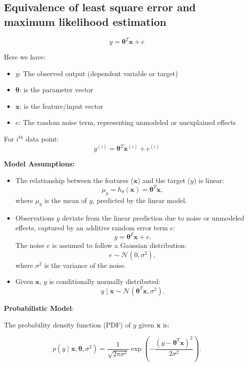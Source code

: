\subsection{Equivalence of least square error and maximum likelihood estimation}
\[
    y = \boldsymbol{\theta}^T \mathbf{x} + e
\]

Here we have:
\begin{itemize}
    \item \( y \): The observed output (dependent variable or target)
    \item \( \boldsymbol{\theta} \): is the parameter vector
    \item \( \mathbf{x} \): is the feature/input vector
    \item \( e \): The random noise term, representing unmodeled or unexplained effects
\end{itemize}

For $i^{th}$ data point:
\[
    y^{(i)} = \boldsymbol{\theta}^T \mathbf{x}^{(i)} + e^{(i)}
\]

\noindent
\textbf{Model Assumptions:}

\begin{itemize}
    \item The relationship between the features (\(\mathbf{x}\)) and the target (\(y\)) is linear:
     \[
     \mu_y = h_\theta(\mathbf{x}) = \boldsymbol{\theta}^T \mathbf{x},
     \]
     where \( \mu_y \) is the mean of \(y\), predicted by the linear model.
    \item Observations \(y\) deviate from the linear prediction due to noise or unmodeled effects, captured by an additive random error term \(e\):
     \[
     y = \boldsymbol{\theta}^T \mathbf{x} + e.
     \]
   The noise \(e\) is assumed to follow a Gaussian distribution:
     \[
     e \sim \mathcal{N}(0, \sigma^2),
     \]
     where \(\sigma^2\) is the variance of the noise.
    \item Given \(\mathbf{x}\), \(y\) is conditionally normally distributed:
     \[
     y \mid \mathbf{x} \sim \mathcal{N}(\boldsymbol{\theta}^T \mathbf{x}, \sigma^2).
     \]
\end{itemize}

\noindent
\textbf{Probabilistic Model}:

The probability density function (PDF) of \(y\) given \(\mathbf{x}\) is:

\begin{equation}
p(y \mid \mathbf{x}, \boldsymbol{\theta}, \sigma^2) = \frac{1}{\sqrt{2 \pi \sigma^2}} \exp\left(-\frac{(y -
\boldsymbol{\theta}^T \mathbf{x})^2}{2\sigma^2}\right).
\end{equation}
\\

